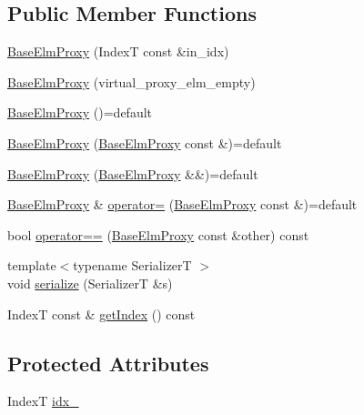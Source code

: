 \subsection*{Public Member Functions}
\begin{DoxyCompactItemize}
\item 
\hyperlink{structvt_1_1vrt_1_1collection_1_1_base_elm_proxy_a2c8be7af02f85fac3f91b02463bf1d2c}{Base\+Elm\+Proxy} (IndexT const \&in\+\_\+idx)
\item 
\hyperlink{structvt_1_1vrt_1_1collection_1_1_base_elm_proxy_afc1708246be4e50baa44a1d3b06fb7c5}{Base\+Elm\+Proxy} (virtual\+\_\+proxy\+\_\+elm\+\_\+empty)
\item 
\hyperlink{structvt_1_1vrt_1_1collection_1_1_base_elm_proxy_a7ba4eeffefda53ae302feb1877789f4f}{Base\+Elm\+Proxy} ()=default
\item 
\hyperlink{structvt_1_1vrt_1_1collection_1_1_base_elm_proxy_acdf49c12d1ec8e9afc2976e9cac2c85d}{Base\+Elm\+Proxy} (\hyperlink{structvt_1_1vrt_1_1collection_1_1_base_elm_proxy}{Base\+Elm\+Proxy} const \&)=default
\item 
\hyperlink{structvt_1_1vrt_1_1collection_1_1_base_elm_proxy_a0e44bb4f28bacdb38c850fb949009fc3}{Base\+Elm\+Proxy} (\hyperlink{structvt_1_1vrt_1_1collection_1_1_base_elm_proxy}{Base\+Elm\+Proxy} \&\&)=default
\item 
\hyperlink{structvt_1_1vrt_1_1collection_1_1_base_elm_proxy}{Base\+Elm\+Proxy} \& \hyperlink{structvt_1_1vrt_1_1collection_1_1_base_elm_proxy_a9e27c5d3fc8f4470bd28dbb4ad9113bb}{operator=} (\hyperlink{structvt_1_1vrt_1_1collection_1_1_base_elm_proxy}{Base\+Elm\+Proxy} const \&)=default
\item 
bool \hyperlink{structvt_1_1vrt_1_1collection_1_1_base_elm_proxy_a2db0482dd87f4dee6635eb79e62566ec}{operator==} (\hyperlink{structvt_1_1vrt_1_1collection_1_1_base_elm_proxy}{Base\+Elm\+Proxy} const \&other) const
\item 
{\footnotesize template$<$typename SerializerT $>$ }\\void \hyperlink{structvt_1_1vrt_1_1collection_1_1_base_elm_proxy_a476847487a0696e4da738ce4e424aefd}{serialize} (SerializerT \&s)
\item 
IndexT const  \& \hyperlink{structvt_1_1vrt_1_1collection_1_1_base_elm_proxy_a511db5c925e46aa42c18be66d8388d6f}{get\+Index} () const
\end{DoxyCompactItemize}
\subsection*{Protected Attributes}
\begin{DoxyCompactItemize}
\item 
IndexT \hyperlink{structvt_1_1vrt_1_1collection_1_1_base_elm_proxy_a7df61a27ad783255844eb2e87f83681b}{idx\+\_\+}
\end{DoxyCompactItemize}


